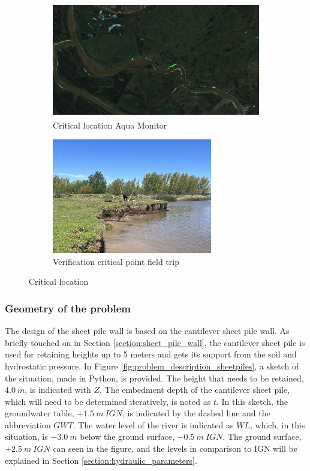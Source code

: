 \begin{figure}[H]
    \centering
    \begin{subfigure}[b]{0.45\textwidth}
        \includegraphics[width=\linewidth, height=5cm]{figures/ch8/critical_location_google.png}
        \caption{Critical location Aqua Monitor}
        \label{fig:critical_location_google}
    \end{subfigure}
    \hfill
    \begin{subfigure}[b]{0.45\textwidth}
        \includegraphics[width=\linewidth, height=5cm]{figures/ch8/critical_location.jpeg}
        \caption{Verification critical point field trip}
        \label{fig:critical_location_fieldtrip}
    \end{subfigure}
    \caption{Critical location}
    \label{fig:critical_location}
\end{figure}

\subsubsection{Geometry of the problem}

The design of the sheet pile wall is based on the cantilever sheet pile wall. As briefly touched on in Section \ref{section:sheet_pile_wall}, the cantilever sheet pile is used for retaining heights up to 5 meters and gets its support from the soil and hydrostatic pressure. In Figure \ref{fig:problem_description_sheetpiles}, a sketch of the situation, made in Python, is provided. The height that needs to be retained, $4.0 \ m$, is indicated with $Z$. The embedment depth of the cantilever sheet pile, which will need to be determined iteratively, is noted as $t$. In this sketch, the groundwater table, $+1.5 \ m \ IGN$, is indicated by the dashed line and the abbreviation $GWT$. The water level of the river is indicated as $WL$, which, in this situation, is $-3.0 \ m$ below the ground surface, $-0.5 \ m \ IGN$. The ground surface, $+2.5 \ m \ IGN$ can seen in the figure, and the levels in comparison to IGN will be explained in Section \ref{section:hydraulic_parameters}. %

